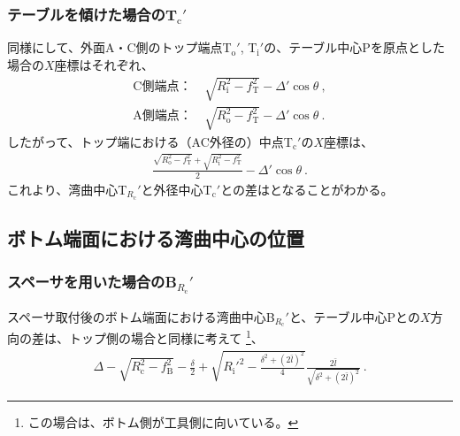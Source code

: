 \subsubsection{テーブルを傾けた場合のT\texorpdfstring{$_\mathrm c'$}{c'}}
同様にして、外面A・C側のトップ端点T$_\mathrm o'$, T$_\mathrm i'$の、テーブル中心Pを原点とした場合の$X$座標はそれぞれ、
\begin{subequations}
\begin{align}
  \label{eq:tableTi}
  \text{C側端点：}&~
  \sqrt{R_\mathrm i^2-f_\mathrm T^2}-\varDelta'\cos\theta\ ,\\
  \text{A側端点：}&~
  \sqrt{R_\mathrm o^2-f_\mathrm T^2}-\varDelta'\cos\theta\ .
\end{align}
\end{subequations}
したがって、トップ端における（AC外径の）中点T$_\mathrm c'$の$X$座標は、
\begin{align}
  \label{eq:tableTc}
  \frac{\sqrt{R_\mathrm o^2-f_\mathrm T^2}+\sqrt{R_\mathrm i^2-f_\mathrm T^2}}2-\varDelta'\cos\theta\ .
\end{align}
これより、湾曲中心T$_{R_\mathrm c}'$と外径中心T$_\mathrm c'$との差はとなることがわかる。




\clearpage



\subsection{ボトム端面における湾曲中心の位置}


\subsubsection{スペーサを用いた場合のB\texorpdfstring{$_{R_\mathrm c}'$}{Rc'}}
スペーサ取付後のボトム端面における湾曲中心B$_{R_\mathrm c}'$と、テーブル中心Pとの$X$方向の差は、トップ側の場合と同様に考えて
\footnote{この場合は、ボトム側が工具側に向いている。}、
\begin{align*}
  \varDelta-\sqrt{R_\mathrm c^2-f_\mathrm B^2}-\frac\delta2
  +\sqrt{R_\mathrm i'^2-\frac{\delta^2+(2\bar l)^2}4}\frac{2\bar l}{\sqrt{\delta^2+(2\bar l)^2}}\ .
\end{align*}


